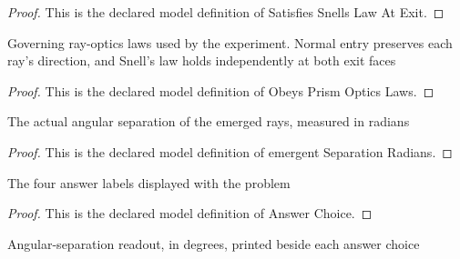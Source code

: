 \begin{proof}
  This is the declared model definition of Satisfies Snells Law At Exit.
\end{proof}
\begin{definition}
  \label{def:physics:phyx-mini-0099:phyxminiproblems-problemphyxmini0099-obeysprismopticslaws}
  Governing ray-optics laws used by the experiment. Normal entry preserves each ray's direction, and Snell's law holds independently at both exit faces
\end{definition}
\begin{proof}
  This is the declared model definition of Obeys Prism Optics Laws.
\end{proof}
\begin{definition}
  \label{def:physics:phyx-mini-0099:phyxminiproblems-problemphyxmini0099-emergentseparationradians}
  The actual angular separation of the emerged rays, measured in radians
\end{definition}
\begin{proof}
  This is the declared model definition of emergent Separation Radians.
\end{proof}
\begin{definition}
  \label{def:physics:phyx-mini-0099:phyxminiproblems-problemphyxmini0099-answerchoice}
  The four answer labels displayed with the problem
\end{definition}
\begin{proof}
  This is the declared model definition of Answer Choice.
\end{proof}
\begin{definition}
  \label{def:physics:phyx-mini-0099:phyxminiproblems-problemphyxmini0099-answerchoice-separationdegrees}
  Angular-separation readout, in degrees, printed beside each answer choice
\end{definition}
